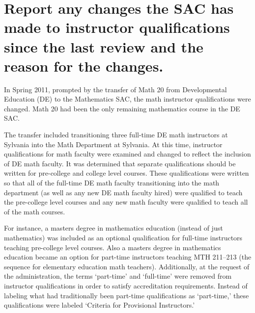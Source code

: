 



\section[Changes to instructor qualifications]{Report any changes the SAC has made to instructor qualifications since
the last review and the reason for the changes.}
In Spring 2011, prompted by the transfer of Math 20 from Developmental
Education (DE) to the Mathematics SAC, the math instructor qualifications were
changed.  Math 20 had been the only remaining mathematics course in the DE SAC.  

The transfer included transitioning three full-time DE math instructors at
Sylvania into the Math Department at Sylvania.  At this time, instructor
qualifications for math faculty were examined and changed to reflect the
inclusion of DE math faculty.  It was determined that separate qualifications
should be written for pre-college and college level courses.  These
qualifications were written so that all of the full-time DE math faculty
transitioning into the math department (as well as any new DE math faculty
hired) were qualified to teach the pre-college level courses and any new math
faculty were qualified to teach all of the math courses.  

For instance, a masters degree in mathematics education (instead of just
mathematics) was included as an optional qualification for full-time
instructors teaching pre-college level courses.  Also a masters degree in
mathematics education became an option for part-time instructors teaching MTH
211--213 (the sequence for elementary education math teachers).  Additionally,
at the request of the administration, the terms `part-time' and `full-time'
were removed from instructor qualifications in order to satisfy accreditation
requirements.  Instead of labeling what had traditionally been part-time
qualifications as `part-time,' these qualifications were labeled `Criteria for
Provisional Instructors.'

